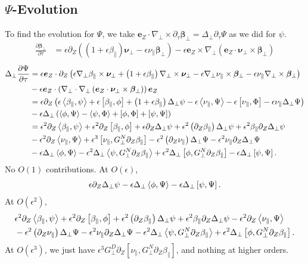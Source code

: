 \documentclass{article}
\newcommand{\para}{\parallel}
\newcommand{\ep}{\epsilon}
\newcommand{\np}{\nabla_\perp}
\newcommand{\lap}{\Delta_\perp}
\newcommand{\p}{\partial}
\newcommand{\deriv}[2]{\frac{\p #1}{\p #2}}
\newcommand{\GN}{G_\perp^N}
\newcommand{\GD}{G_\perp^D}
\newcommand{\pth} [1] {\left( #1 \right) }
\newcommand{\br} [1] {\left[ #1 \right] }
\begin{document}
\subsection{$\Psi$-Evolution}
To find the evolution for $\Psi$, we take $\bm{e}_Z\cdot\np\times\p_\tau\bm{\beta}_\perp = \lap\p_\tau\Psi$ as we did for $\psi$.
\begin{align*}
    \deriv{\bm{\beta}_\perp}{\tau} &= \ep\p_Z\pth{\pth{1+\ep\beta_\para}\bm{\nu}_\perp - \ep\nu_\para\bm{\beta}_\perp} - \ep\bm{e}_Z\times\np\pth{\bm{e}_Z\cdot\bm{\nu}_\perp\times\bm{\beta}_\perp}
\end{align*}
\begin{align*}
    \lap\deriv{\Psi}{\tau} &= \ep\bm{e}_Z\cdot\p_Z\pth{\ep\np\beta_\para\times\bm{\nu}_\perp + \pth{1+\ep\beta_\para}\np\times\bm{\nu}_\perp - \ep\np\nu_\para\times\bm{\beta}_\perp - \ep\nu_\para\np\times\bm{\beta}_\perp} \\
    &- \ep\bm{e}_Z\cdot\pth{\np\cdot\np\pth{\bm{e}_Z\cdot\bm{\nu}_\perp\times\bm{\beta}_\perp}}\bm{e}_Z \\
    &= \ep\p_Z\pth{\ep\Braket{\beta_\para, \psi} + \ep\br{\beta_\para, \phi} + \pth{1+\ep\beta_\para}\lap\psi - \ep\Braket{\nu_\para, \Psi} - \ep\br{\nu_\para, \Phi} - \ep\nu_\para\lap\Psi} \\ 
    &- \ep\lap\pth{\Braket{\phi, \Psi} - \Braket{\psi, \Phi} + \br{\phi, \Phi} + \br{\psi, \Psi}} \\
    &= \ep^2\p_Z\Braket{\beta_\para, \psi} + \ep^2\p_Z\br{\beta_\para, \phi} + \ep\p_Z\lap\psi + \ep^2\pth{\p_Z\beta_\para}\lap\psi + \ep^2\beta_\para\p_Z\lap\psi \\
    &- \ep^2\p_Z\Braket{\nu_\para, \Psi} + \ep^3\br{\nu_\para, \GN\p_Z\beta_\para} - \ep^2\pth{\p_Z\nu_\para}\lap\Psi - \ep^2\nu_\para\p_Z\lap\Psi \\
    &- \ep\lap\Braket{\phi, \Psi} - \ep^2\lap\Braket{\psi, \GN\p_Z\beta_\para} + \ep^2\lap\br{\phi, \GN\p_Z\beta_\para} - \ep\lap\br{\psi, \Psi}.
\end{align*}
No $O(1)$ contributions. At $O(\ep)$, 
\begin{align*}
    \ep\p_Z\lap\psi - \ep\lap\Braket{\phi, \Psi} - \ep\lap\br{\psi, \Psi}. 
\end{align*}
At $O\pth{\ep^2}$,
\begin{align*}
    &\ep^2\p_Z \Braket{\beta_\para, \psi} + \ep^2\p_Z\br{\beta_\para, \phi} + \ep^2\pth{\p_Z\beta_\para}\lap\psi + \ep^2\beta_\para\p_Z\lap\psi - \ep^2\p_Z\Braket{\nu_\para, \Psi} \\
    &- \ep^2\pth{\p_Z\nu_\para}\lap\Psi - \ep^2\nu_\para\p_Z\lap\Psi - \ep^2\lap\Braket{\psi, \GN\p_Z\beta_\para} + \ep^2\lap\br{\phi, \GN\p_Z\beta_\para}. 
\end{align*}
At $O\pth{\ep^3}$, we just have $\ep^3\GD\p_Z\br{\nu_\para, \GN\p_Z\beta_\para}$, and nothing at higher orders. 
\end{document}
